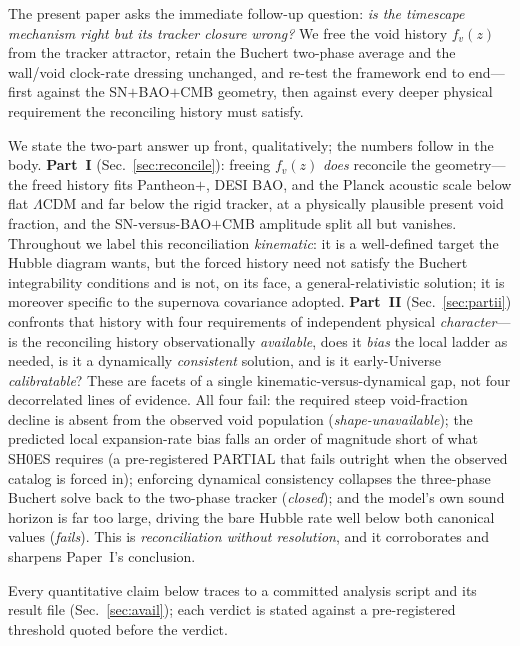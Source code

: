 \documentclass[aps,prd,twocolumn,nofootinbib,superscriptaddress,floatfix]{revtex4-2}
\newcommand{\fvz}{f_{v}(z)}
\newcommand{\Lcdm}{\Lambda\mathrm{CDM}}
\begin{document}
The present paper asks the immediate follow-up question: \emph{is the timescape
mechanism right but its tracker closure wrong?} We free the void history $\fvz$
from the tracker attractor, retain the Buchert two-phase average and the
wall/void clock-rate dressing unchanged, and re-test the framework end to
end---first against the SN$+$BAO$+$CMB geometry, then against every deeper
physical requirement the reconciling history must satisfy.

We state the two-part answer up front, qualitatively; the numbers follow in the
body. \textbf{Part~I} (Sec.~\ref{sec:reconcile}): freeing $\fvz$ \emph{does}
reconcile the geometry---the freed history fits Pantheon$+$, DESI BAO, and the
Planck acoustic scale below flat $\Lcdm$ and far below the rigid tracker, at a
physically plausible present void fraction, and the SN-versus-BAO$+$CMB amplitude
split all but vanishes. Throughout we label this reconciliation \emph{kinematic}:
it is a well-defined target the Hubble diagram wants, but the forced history need
not satisfy the Buchert integrability conditions and is not, on its face, a
general-relativistic solution; it is moreover specific to the supernova covariance
adopted. \textbf{Part~II} (Sec.~\ref{sec:partii}) confronts that history with four
requirements of independent physical \emph{character}---is the reconciling history
observationally \emph{available}, does it \emph{bias} the local ladder as needed,
is it a dynamically \emph{consistent} solution, and is it early-Universe
\emph{calibratable}? These are facets of a single kinematic-versus-dynamical gap,
not four decorrelated lines of evidence. All four fail: the required steep
void-fraction decline is absent from the observed void population
(\emph{shape-unavailable}); the predicted local expansion-rate bias falls an order
of magnitude short of what SH0ES requires (a pre-registered PARTIAL that fails
outright when the observed catalog is forced in); enforcing dynamical consistency
collapses the three-phase Buchert solve back to the two-phase tracker
(\emph{closed}); and the model's own sound horizon is far too large, driving the
bare Hubble rate well below both canonical values (\emph{fails}). This is
\emph{reconciliation without resolution}, and it corroborates and sharpens
Paper~I's conclusion.

Every quantitative claim below traces to a committed analysis script and its
result file (Sec.~\ref{sec:avail}); each verdict is stated against a
pre-registered threshold quoted before the verdict.

\end{document}

